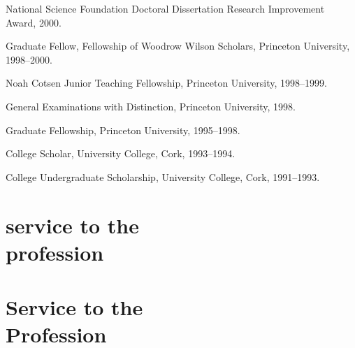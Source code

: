 \documentclass[11pt,oneside,a4paper,DIV=8]{scrartcl}
\begin{document}
National Science Foundation Doctoral Dissertation Research Improvement Award, 2000.

Graduate Fellow, Fellowship of Woodrow Wilson Scholars, Princeton University,  1998--2000. 

Noah Cotsen Junior Teaching Fellowship, Princeton University, 1998--1999.

General Examinations with Distinction, Princeton University, 1998.

Graduate Fellowship, Princeton University, 1995--1998.

College Scholar, University College, Cork, 1993--1994.

College Undergraduate Scholarship, University
College, Cork, 1991--1993.

 


\section{service to the \\ profession}





\section{Service to the \\ Profession}
\end{document}
